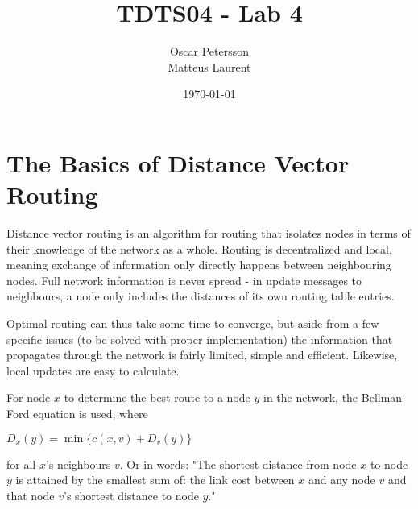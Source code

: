 \documentclass[10pt,a4paper]{article}
\author{Oscar Petersson\\Matteus Laurent}
\title{TDTS04 - Lab 4}
\date{\today}
\newcommand{\course}{Computer Networks and Distributed Systems}
\newcommand{\coursenumber}{TDTS04, Linköping University}
\newcommand{\examiner}{Meysam Aghighi}
\newcommand{\institution}{IDA}
\newcommand{\reptype}{Laboration Report}
\begin{document}
\setcounter{secnumdepth}{3}
\setcounter{tocdepth}{3}




\pagestyle{plain}
\setcounter{page}{1}

\section{The Basics of Distance Vector Routing}
Distance vector routing is an algorithm for routing that isolates nodes in terms of their knowledge of the network as a whole.\cite{Kurose} Routing is decentralized and local, meaning exchange of information only directly happens between neighbouring nodes. Full network information is never spread - in update messages to neighbours, a node only includes the distances of its own routing table entries.

Optimal routing can thus take some time to converge, but aside from a few specific issues (to be solved with proper implementation) the information that propagates through the network is fairly limited, simple and efficient. Likewise, local updates are easy to calculate.

For node $x$ to determine the best route to a node $y$ in the network, the Bellman-Ford equation is used, where

$D_x(y) = \min\{ c(x,v) + D_v(y) \}$

for all $x$'s neighbours $v$. Or in words: 
"The shortest distance from node $x$ to node $y$ is attained by the smallest sum of: the link cost between $x$ and any node $v$ and that node $v$'s shortest distance to node $y$."
\end{document}
